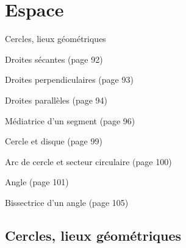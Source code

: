 \documentclass[a4paper,11pt]{report}
\begin{document}
\newcommand{\chapterName}{Espace}
\newcommand{\serieName}{Cercles, lieux géométriques}


\chapter*{\chapterName}
\thispagestyle{empty}

\begin{amL}{\serieName}{
\item Droites sécantes (page 92)
\item Droites perpendiculaires (page 93)
\item Droites parallèles (page 94)
\item Médiatrice d'un segment (page 96)
\item Cercle et disque (page 99)
\item Arc de cercle et secteur circulaire (page 100)
\item Angle (page 101)
\item Bissectrice d'un angle (page 105)
}
\end{amL}

\section*{\serieName}
\setcounter{page}{1}
\thispagestyle{firstPage}



\end{document}
